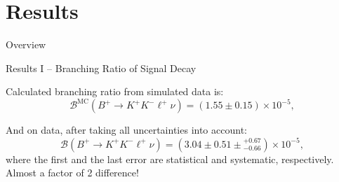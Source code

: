\documentclass[serif]{beamer}
\newcommand {\E}[1]{\times 10^{#1}}
\begin{document}

\section{Results} 

\begin{frame}[t]{Overview}
\end{frame}


\begin{frame}[t]{Results I -- Branching Ratio of Signal Decay}

Calculated branching ratio from simulated data is:
$$
\mathcal{B}^{\mathrm{MC}}(B^+ \to K^+ K^- \ell^+ \nu) = (1.55 \pm 0.15)\E{-5},
$$


And on data, after taking all uncertainties into account:
$$
\mathcal{B}(B^+ \to K^+ K^- \ell^+ \nu) = (3.04 \pm 0.51 \pm {}^{+0.67}_{-0.66})\E{-5},
$$
where the first and the last error are statistical and systematic, respectively.\\

\vspace{1cm}
\textcolor{turtlegreen}{Almost a factor of 2 difference!}

\end{frame}

\end{document}
